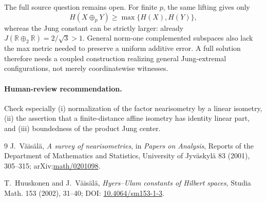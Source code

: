 \documentclass[11pt]{article}
\begin{document}
The full source question remains open.  For finite $p$, the same lifting gives
only
\[
 H(X\oplus_pY)\geq\max\{H(X),H(Y)\},
\]
whereas the Jung constant can be strictly larger: already
$J(\mathbb R\oplus_2\mathbb R)=2/\sqrt3>1$.  General norm-one complemented
subspaces also lack the max metric needed to preserve a uniform additive
error.  A full solution therefore needs a coupled construction realizing
general Jung-extremal configurations, not merely coordinatewise witnesses.

\paragraph{Human-review recommendation.}
Check especially (i) normalization of the factor nearisometry by a linear
isometry, (ii) the assertion that a finite-distance affine isometry has
identity linear part, and (iii) boundedness of the product Jung center.

\begin{thebibliography}{9}
J.~V\"ais\"al\"a,
\emph{A survey of nearisometries},
in \emph{Papers on Analysis}, Reports of the Department of Mathematics and
Statistics, University of Jyv\"askyl\"a 83 (2001), 305--315;
arXiv:\href{https://arxiv.org/abs/math/0201098}{math/0201098}.

T.~Huuskonen and J.~V\"ais\"al\"a,
\emph{Hyers--Ulam constants of Hilbert spaces},
Studia Math. 153 (2002), 31--40;
DOI: \href{https://doi.org/10.4064/sm153-1-3}{10.4064/sm153-1-3}.
\end{thebibliography}
\end{document}

